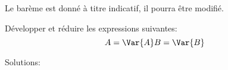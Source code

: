 \documentclass[a4paper,10pt]{/media/documents/Cours/Prof/Enseignements/Archive/2013-2014/tools/style/classDS}
\date{26 septemble 2013}
\begin{document}
\maketitle

\Calc
Le barème est donné à titre indicatif, il pourra être modifié.

\begin{Exo}[4.5]
		Développer et réduire les expressions suivantes:
		\begin{equation*}
            A = \Var{ A } \\
            B = \Var{ B }
		\end{equation*}

        Solutions:
\end{Exo}
\end{document}
